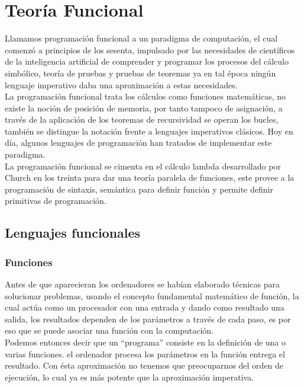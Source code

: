 
\chapter{Teoría Funcional}

Llamamos programación funcional a un paradigma de computación, el cual comenzó a principios de los sesenta, impulsado por las necesidades de científicos de la inteligencia artificial de comprender y programar los procesos del cálculo simbólico, teoría de pruebas y pruebas de teoremas ya en tal época ningún lenguaje imperativo daba una aproximación a estas necesidades.\\
La programación funcional trata los cálculos como funciones matemáticas, no existe la noción de posición de memoria, por tanto tampoco de asignación, a través de la aplicación de los teoremas de recursividad se operan los bucles, también se distingue la notación frente a lenguajes imperativos clásicos. Hoy en día, algunos lenguajes de programación han tratados de implementar este paradigma.\\
La programación funcional se cimenta en el cálculo lambda desarrollado por Church en los treinta para dar una teoría paralela de funciones, este provee a la programación de sintaxis, semántica para definir función y permite definir primitivas de programación.

\section{Lenguajes funcionales}

\subsection{Funciones}

Antes de que aparecieran los ordenadores se habían elaborado técnicas para solucionar problemas,  usando el concepto fundamental matemático de función, la cual actúa como un procesador con una entrada y dando como resultado una salida, los resultados dependen de los parámetros a través de cada paso, es por eso que se puede asociar una función con la computación.\\

Podemos entonces decir que un ``programa'' consiste en la definición de una o varias funciones.  el ordenador procesa los parámetros en la función  entrega el resultado. Con ésta aproximación no tenemos que preocuparnos del orden de ejecución, lo cual ya es más potente que la aproximación imperativa.

